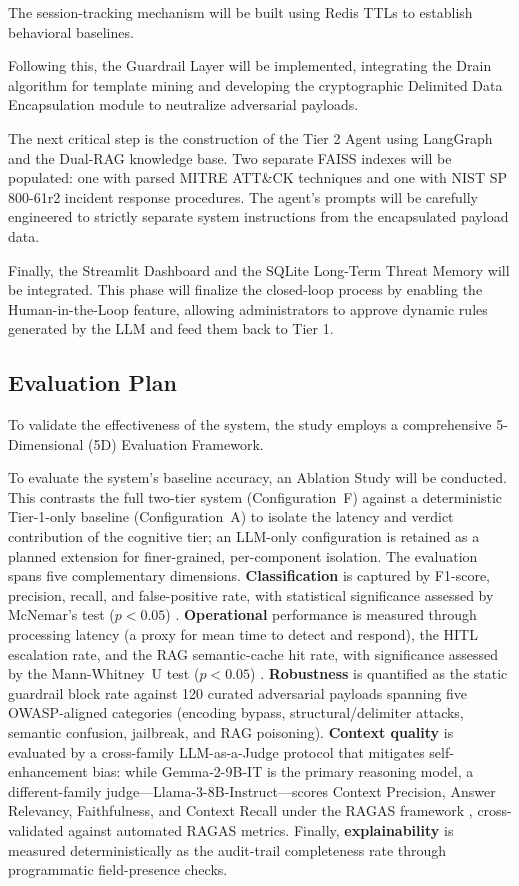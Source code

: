 \documentclass[12pt,a4paper]{article}
\begin{document}
The session-tracking mechanism will be built using Redis TTLs to establish behavioral baselines.

Following this, the Guardrail Layer will be implemented, integrating the Drain algorithm for template mining and developing the cryptographic Delimited Data Encapsulation module to neutralize adversarial payloads.

The next critical step is the construction of the Tier 2 Agent using LangGraph and the Dual-RAG knowledge base. Two separate FAISS indexes will be populated: one with parsed MITRE ATT\&CK techniques and one with NIST SP 800-61r2 incident response procedures. The agent's prompts will be carefully engineered to strictly separate system instructions from the encapsulated payload data.

Finally, the Streamlit Dashboard and the SQLite Long-Term Threat Memory will be integrated. This phase will finalize the closed-loop process by enabling the Human-in-the-Loop feature, allowing administrators to approve dynamic rules generated by the LLM and feed them back to Tier 1.

\subsection{Evaluation Plan}
To validate the effectiveness of the system, the study employs a comprehensive 5-Dimensional (5D) Evaluation Framework.

To evaluate the system's baseline accuracy, an Ablation Study will be conducted. This contrasts the full two-tier system (Configuration~F) against a deterministic Tier-1-only baseline (Configuration~A) to isolate the latency and verdict contribution of the cognitive tier; an LLM-only configuration is retained as a planned extension for finer-grained, per-component isolation.
The evaluation spans five complementary dimensions. \textbf{Classification} is captured by F1-score, precision, recall, and false-positive rate, with statistical significance assessed by McNemar's test ($p<0.05$) \cite{mcnemar1947}. \textbf{Operational} performance is measured through processing latency (a proxy for mean time to detect and respond), the HITL escalation rate, and the RAG semantic-cache hit rate, with significance assessed by the Mann-Whitney~U test ($p<0.05$) \cite{mannwhitney1947}. \textbf{Robustness} is quantified as the static guardrail block rate against 120 curated adversarial payloads spanning five OWASP-aligned categories \cite{owasp2025} (encoding bypass, structural/delimiter attacks, semantic confusion, jailbreak, and RAG poisoning). \textbf{Context quality} is evaluated by a cross-family LLM-as-a-Judge protocol that mitigates self-enhancement bias: while Gemma-2-9B-IT is the primary reasoning model, a different-family judge---Llama-3-8B-Instruct---scores Context Precision, Answer Relevancy, Faithfulness, and Context Recall under the RAGAS framework \cite{ragas2023}, cross-validated against automated RAGAS metrics. Finally, \textbf{explainability} is measured deterministically as the audit-trail completeness rate through programmatic field-presence checks.
\end{document}
